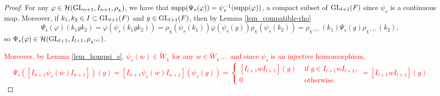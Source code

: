     \begin{proof}
        For any $\varphi\in\mathcal{H}(\mathrm{GL}_{n+1},I_{n+1},\rho_\chi)$, we have that $\mathrm{supp}(\Psi_s(\varphi))=\psi_s^{-1}(\mathrm{supp}(\varphi))$, a compact subset of $\mathrm{GL}_{l+1}(F)$ since $\psi_s$ is a continuous map. Moreover, if $k_1,k_2\in I\subset\mathrm{GL}_{l+1}(F)$ and $g\in\mathrm{GL}_{l+1}(F)$, then by Lemma \ref{lem_compatible-rho}
        $$\Psi_s(\varphi)(k_1gk_2)=\varphi(\psi_s(k_1gk_2))=\rho_\chi(\psi_s(k_1))\varphi(\psi_s(g))\rho_\chi(\psi_s(k_2))=\rho_{\chi^{(s)}}(k_1)\Psi_s(g)\rho_{\chi^{(s)}}(k_2),$$
        so $\Psi_s(\varphi)\in\mathcal{H}(\mathrm{GL}_{l+1},I_{l+1},\rho_{\chi^{(s)}})$.

        \textcolor{red}{Moreover, by Lemma \ref{lem_hompsi_s}, $\overline{\psi}_s(w)\in \widetilde{W}_{\chi}$ for any $w\in\widetilde{W}_{\chi^{(s)}}$ and since $\psi_s$ is an injective homomorphism,
        \begin{equation*}
            \Psi_s\left([I_{n+1}\overline{\psi}_s(w)I_{n+1}]\right)(g)=[I_{n+1}\overline{\psi}_s(w)I_{n+1}](\psi_s(g))=
            \begin{cases}
                [I_{l+1}wI_{l+1}](g)&\text{ if }g\in I_{l+1}wI_{l+1},\\
                0 &\text{ otherwise}.
            \end{cases}
            =[I_{l+1}wI_{l+1}](g)
        \end{equation*}}
        

\end{proof}
